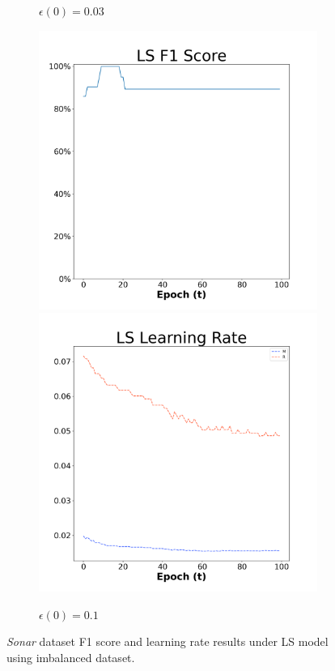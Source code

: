 \begin{figure}[H]
\begin{subfigure}{0.3\textwidth}
  \caption{$\epsilon(0)=0.03$}
\end{subfigure}\hfil %
\begin{subfigure}{0.3\textwidth}
  \includegraphics[width=\linewidth]{images/exper2/Sonar/LS_0.1_f1.png}
  \includegraphics[width=\linewidth]{images/exper2/Sonar/LS_0.1_lr.png}
  \caption{$\epsilon(0)=0.1$}
\end{subfigure}

\caption{\textit{Sonar} dataset F1 score and learning rate results under LS model using imbalanced dataset.}
\end{figure}

